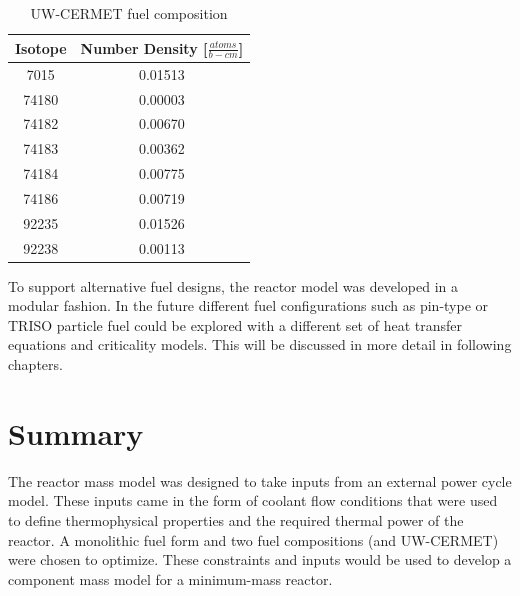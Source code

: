\begin{table}[h]
  \centering
  \caption{UW-CERMET fuel composition}
  \begin{tabular}{cc}
    \toprule
    Isotope   & Number Density [$\frac{atoms}{b-cm}$] \\
    \midrule
    7015	&	0.01513	\\
    74180	&	0.00003	\\
    74182	&	0.00670	\\
    74183	&	0.00362	\\
    74184	&	0.00775	\\
    74186	&	0.00719	\\
    92235	&	0.01526	\\
    92238	&	0.00113	\\
  \end{tabular}
  \label{tab:uw_comp}
\end{table}

\newpage

To support alternative fuel designs, the reactor model was developed in a modular fashion.
In the future different fuel configurations such as pin-type or TRISO particle fuel could be
explored with a different set of heat transfer equations and criticality models.
This will be discussed in more detail in following chapters.

\section{Summary}
The reactor mass model was designed to take inputs from an external power cycle
model. These inputs came in the form of coolant flow conditions that were used
to define thermophysical properties and the required thermal power of the
reactor. A monolithic fuel form and two fuel compositions (\uox and UW-CERMET)
were chosen to optimize. These constraints and inputs would be used to develop a
component mass model for a minimum-mass reactor.
